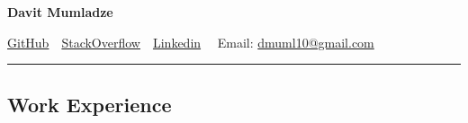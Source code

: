 \documentclass[10pt,letterpaper]{article}
\begin{document}
\begin{center}
{\huge \textbf{Davit Mumladze}}


\href{https://github.com/dmuml10/}{GitHub}\ \
 \href{https://stackoverflow.com/users/2210779/davit-mumladze}{StackOverflow}\ \
 \href{https://www.linkedin.com/in/davit-mumladze-494526b5/}{Linkedin}
\textbullet
\ \ Email: \href{mailto:dmuml10@gmail.com}{dmuml10@gmail.com}

\end{center}


\hrule
\vspace{-1.0em}
\subsection*{Work Experience}
\end{document}
